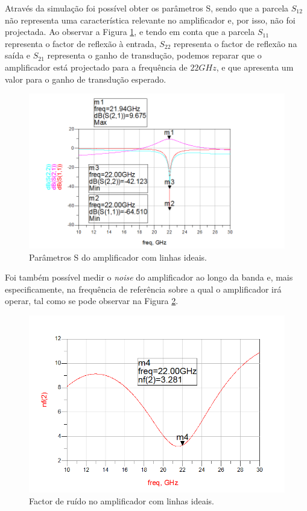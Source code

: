 \documentclass[11pt]{article}
\numberwithin{equation}{section}
\begin{document}
Através da simulação foi possível obter os parâmetros S, sendo que a parcela $S_{12}$ não representa uma característica relevante no amplificador e, por isso, não foi projectada. Ao observar a Figura \ref{fig:ideal_S}, e tendo em conta que a parcela $S_{11}$ representa o factor de reflexão à entrada, $S_{22}$ representa o factor de reflexão na saída e $S_{21}$ representa o ganho de transdução, podemos reparar que o amplificador está projectado para a frequência de $ 22 GHz $, e que apresenta um valor para o ganho de transdução esperado.

\begin{figure}[H]
	\centering
	\includegraphics[keepaspectratio=true, scale=0.45]{exps/Ideal_S}
	\vspace{-0.5em}
	\caption{Parâmetros S do amplificador com linhas ideais.}
	\vspace{-0.8em}
	\label{fig:ideal_S}
\end{figure}

Foi também possível medir o \textit{noise} do amplificador ao longo da banda e, mais especificamente, na frequência de referência sobre a qual o amplificador irá operar, tal como se pode observar na Figura \ref{fig:ideal_noise}.

\begin{figure}[H]
	\centering
	\includegraphics[keepaspectratio=true, scale=0.45]{exps/Ideal_noise}
	\vspace{-0.5em}
	\caption{Factor de ruído no amplificador com linhas ideais.}
	\vspace{-0.8em}
	\label{fig:ideal_noise}
\end{figure}
\end{document}
